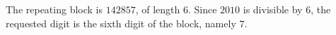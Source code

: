 The repeating block is $142857$, of length $6$. Since $2010$ is divisible by $6$, the requested digit is the sixth digit of the block, namely $\boxed 7$.
